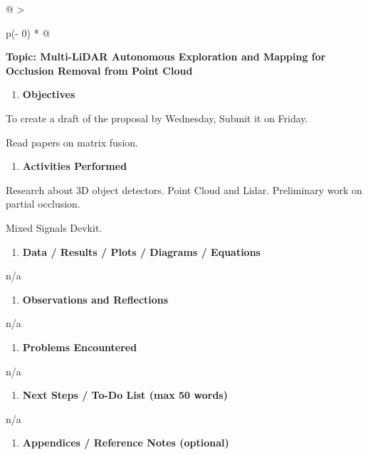 \begin{longtable}[]{@{}
  >{\raggedright\arraybackslash}p{(\columnwidth - 0\tabcolsep) * }@{}}
\begin{minipage}[t]{\linewidth}
\textbf{Topic: Multi-LiDAR Autonomous Exploration and Mapping for
Occlusion Removal from Point Cloud}

\begin{enumerate}
\def\labelenumi{\arabic{enumi}.}
\item
  \textbf{Objectives}
\end{enumerate}

To create a draft of the proposal by Wednesday, Submit it on Friday.

Read papers on matrix fusion.

\begin{enumerate}
\def\labelenumi{\arabic{enumi}.}
\setcounter{enumi}{1}
\item
  \textbf{Activities Performed}
\end{enumerate}

Research about 3D object detectors. Point Cloud and Lidar. Preliminary
work on partial occlusion.

Mixed Signals Devkit.

\begin{enumerate}
\def\labelenumi{\arabic{enumi}.}
\setcounter{enumi}{2}
\item
  \textbf{Data / Results / Plots / Diagrams / Equations}
\end{enumerate}

n/a

\begin{enumerate}
\def\labelenumi{\arabic{enumi}.}
\setcounter{enumi}{3}
\item
  \textbf{Observations and Reflections}
\end{enumerate}

n/a

\begin{enumerate}
\def\labelenumi{\arabic{enumi}.}
\setcounter{enumi}{4}
\item
  \textbf{Problems Encountered}
\end{enumerate}

n/a

\begin{enumerate}
\def\labelenumi{\arabic{enumi}.}
\setcounter{enumi}{5}
\item
  \textbf{Next Steps / To-Do List (max 50 words)}
\end{enumerate}

n/a

\begin{enumerate}
\def\labelenumi{\arabic{enumi}.}
\setcounter{enumi}{6}
\item
  \textbf{Appendices / Reference Notes (optional)}
\end{enumerate}


\end{minipage}
\end{longtable}
